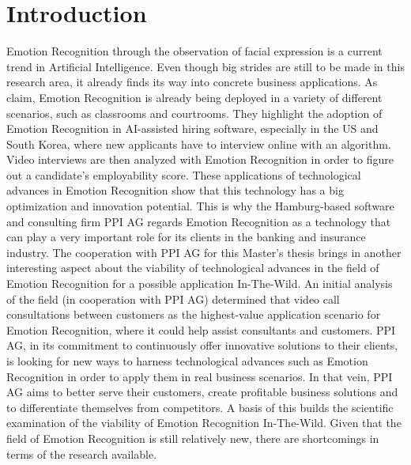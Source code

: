 
\chapter{Introduction}

Emotion Recognition through the observation of facial expression is a current trend in Artificial Intelligence. Even though big strides are still to be made in this research area, it already finds its way into concrete business applications. As \citet{Chen:2020:EmotionAI} claim, Emotion Recognition is already being deployed in a variety of different scenarios, such as classrooms and courtrooms. They highlight the adoption of Emotion Recognition in AI-assisted hiring software, especially in the US and South Korea, where new applicants have to interview online with an algorithm. Video interviews are then analyzed with Emotion Recognition in order to figure out a candidate's employability score.
\newline\newline
These applications of technological advances in Emotion Recognition show that this technology has a big optimization and innovation potential. This is why the Hamburg-based software and consulting firm PPI AG regards Emotion Recognition as a technology that can play a very important role for its clients in the banking and insurance industry. The cooperation with PPI AG for this Master's thesis brings in another interesting aspect about the viability of technological advances in the field of Emotion Recognition for a possible application In-The-Wild. An initial analysis of the field (in cooperation with PPI AG) determined that video call consultations between customers as the highest-value application scenario for Emotion Recognition, where it could help assist consultants and customers.
\newline\newline
PPI AG, in its commitment to continuously offer innovative solutions to their clients, is looking for new ways to harness technological advances such as Emotion Recognition in order to apply them in real business scenarios. In that vein, PPI AG aims to better serve their customers, create profitable business solutions and to differentiate themselves from competitors. A basis of this builds the scientific examination of the viability of Emotion Recognition In-The-Wild. Given that the field of Emotion Recognition is still relatively new, there are shortcomings in terms of the research available.
\newline\newline
